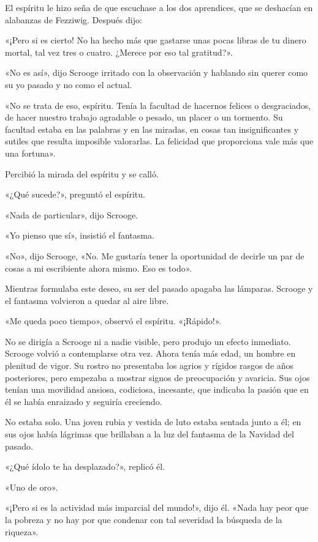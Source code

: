 \documentclass{novela}
\begin{document}
 El espíritu le hizo seña de que escuchase a los dos aprendices, que se deshacían en alabanzas de Fezziwig. Después dijo:

 «¡Pero si es cierto! No ha hecho más que gastarse unas pocas libras de tu dinero mortal, tal vez tres o cuatro. ¿Merece por eso tal gratitud?».

 «No es así», dijo Scrooge irritado con la observación y hablando sin querer como su yo pasado y no como el actual.

 «No se trata de eso, espíritu. Tenía la facultad de hacernos felices o desgraciados, de hacer nuestro trabajo agradable o pesado, un placer o un tormento. Su facultad estaba en las palabras y en las miradas, en cosas tan insignificantes y sutiles que resulta imposible valorarlas. La felicidad que proporciona vale más que una fortuna».

 Percibió la mirada del espíritu y se calló.

 «¿Qué sucede?», preguntó el espíritu.

 «Nada de particular», dijo Scrooge.

 «Yo pienso que sí», insistió el fantasma.

 «No», dijo Scrooge, «No. Me gustaría tener la oportunidad de decirle un par de cosas a mi escribiente ahora mismo. Eso es todo».

 Mientras formulaba este deseo, su ser del pasado apagaba las lámparas. Scrooge y el fantasma volvieron a quedar al aire libre.

 «Me queda poco tiempo», observó el espíritu. «¡Rápido!».

 No se dirigía a Scrooge ni a nadie visible, pero produjo un efecto inmediato. Scrooge volvió a contemplarse otra vez. Ahora tenía más edad, un hombre en plenitud de vigor. Su rostro no presentaba los agrios y rígidos rasgos de años posteriores, pero empezaba a mostrar signos de preocupación y avaricia. Sus ojos tenían una movilidad ansiosa, codiciosa, incesante, que indicaba la pasión que en él se había enraizado y seguiría creciendo.

 No estaba solo. Una joven rubia y vestida de luto estaba sentada junto a él; en sus ojos había lágrimas que brillaban a la luz del fantasma de la Navidad del pasado.

 «¿Qué ídolo te ha desplazado?», replicó él.

 «Uno de oro».

 «¡Pero si es la actividad más imparcial del mundo!», dijo él. «Nada hay peor que la pobreza y no hay por que condenar con tal severidad la búsqueda de la riqueza».
\end{document}
